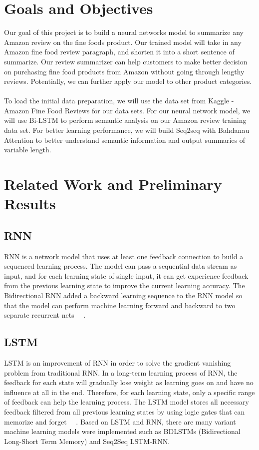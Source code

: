 \documentclass[conference]{IEEEtran}
\begin{document}
\section{Goals and Objectives}
Our goal of this project is to build a neural networks model to summarize any Amazon review on the fine foods product. Our trained model will take in any Amazon fine food review paragraph, and shorten it into a short sentence of summarize. Our review summarizer can help customers to make better decision on purchasing fine food products from Amazon without going through lengthy reviews. Potentially, we can further apply our model to other product categories.\\\\
\indent To load the initial data preparation, we will use the data set from Kaggle - Amazon Fine Food Reviews for our data sets. For our neural network model, we will use Bi-LSTM to perform semantic analysis on our Amazon review training data set. For better learning performance, we will build Seq2seq with Bahdanau Attention to better understand semantic information and output summaries of variable length.

\section{Related Work and Preliminary Results}
\subsection{RNN}
RNN is a network model that uses at least one feedback connection to build a sequenced learning process. The model can pass a sequential data stream as input, and for each learning state of single input, it can get experience feedback from the previous learning state to improve the current learning accuracy. The Bidirectional RNN added a backward learning sequence to the RNN model so that the model can perform machine learning forward and backward to two separate recurrent nets ~\cite{vu2016bi}~\cite{schuster1997bidirectional}. 
\subsection{LSTM}
LSTM is an improvement of RNN in order to solve the gradient vanishing problem from traditional RNN. In a long-term learning process of RNN, the feedback for each state will gradually lose weight as learning goes on and have no influence at all in the end. Therefore, for each learning state, only a specific range of feedback can help the learning process. The LSTM model stores all necessary feedback filtered from all previous learning states by using logic gates that can memorize and forget ~\cite{hochreiter1997long}~\cite{gers2000learning}. Based on LSTM and RNN, there are many variant machine learning models were implemented such as BDLSTMs (Bidirectional Long-Short Term Memory) and Seq2Seq LSTM-RNN. 
\end{document}
